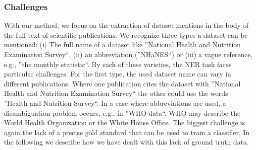 \subsubsection{Challenges}
With our method, we focus on the extraction of dataset mentions in the body of the full-text of scientific publications. We recognize three types a dataset can be mentioned: (i) The full name of a dataset like ''National Health and Nutrition Examination Survey``, (ii) an abbreviation (''NHaNES``) or (iii) a vague reference, e.g., ''the monthly statistic``. 
By each of these varieties, the NER task faces particular challenges. For the first type, the used dataset name can vary in different publications. Where one publication cites the dataset with ''National Health and Nutrition Examination Survey`` the other could use the words  ''Health and Nutrition Survey``.
In a case where abbreviations are used, a disambiguation problem occurs, e.g., in ''WHO data``. WHO may describe the World Health Organization or the White House Office.
The biggest challenge is again the lack of a precise gold standard that can be used to train a classifier.
In the following we describe how we have dealt with this lack of ground truth data.

